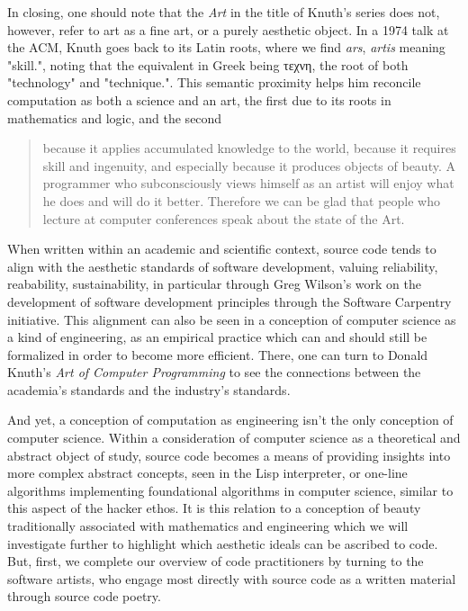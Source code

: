In closing, one should note that the \emph{Art} in the title of Knuth's series does not, however, refer to art as a fine art, or a purely aesthetic object. In a 1974 talk at the ACM, Knuth goes back to its Latin roots, where we find \emph{ars}, \emph{artis} meaning "skill.", noting that the equivalent in Greek being τεχνη, the root of both "technology" and "technique.". This semantic proximity helps him reconcile computation as both a science and an art, the first due to its roots in mathematics and logic, and the second

\begin{quote}
  because it applies accumulated knowledge to the world, because it requires skill and ingenuity, and especially because it produces objects of beauty. A programmer who subconsciously views himself as an artist will enjoy what he does and will do it better. Therefore we can be glad that people who lecture at computer conferences speak about the state of the Art. \citep{knuth_computer_1974}
\end{quote}

\vspace{1\baselineskip}

When written within an academic and scientific context, source code tends to align with the aesthetic standards of software development, valuing reliability, reabability, sustainability, in particular through Greg Wilson's work on the development of software development principles through the Software Carpentry initiative. This alignment can also be seen in a conception of computer science as a kind of engineering, as an empirical practice which can and should still be formalized in order to become more efficient. There, one can turn to Donald Knuth's \emph{Art of Computer Programming} to see the connections between the academia's standards and the industry's standards.

And yet, a conception of computation as engineering isn't the only conception of computer science. Within a consideration of computer science as a  theoretical and abstract object of study, source code becomes a means of providing insights into more complex abstract concepts, seen in the Lisp interpreter, or one-line algorithms implementing foundational algorithms in computer science, similar to this aspect of the hacker ethos. It is this relation to a conception of beauty traditionally associated with mathematics and engineering which we will investigate further to highlight which aesthetic ideals can be ascribed to code. But, first, we complete our overview of code practitioners by turning to the software artists, who engage most directly with source code as a written material through source code poetry.


